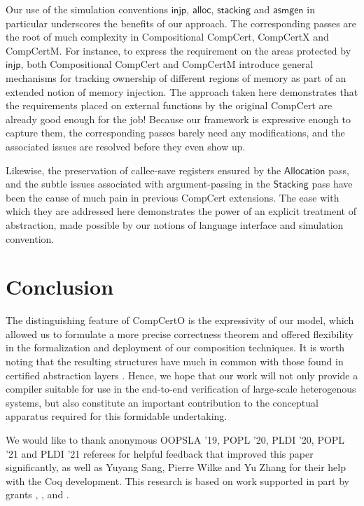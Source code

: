 \documentclass[sigplan,10pt,review]{acmart}
\newcommand{\kw}[1]{\ensuremath{ \mathsf{#1} }}
\begin{document}
Our use of the simulation conventions
\kw{injp}, \kw{alloc}, \kw{stacking} and \kw{asmgen}
in particular
underscores the benefits of our approach.
The corresponding passes are the root of
much complexity
in Compositional CompCert, CompCertX and CompCertM.
For instance,
to express the requirement on
the areas protected by \kw{injp},
both Compositional CompCert and CompCertM
introduce general mechanisms for tracking ownership of
different regions of memory
as part of an extended notion of memory injection.
The approach taken here demonstrates that
the requirements placed on external functions
by the original CompCert
are already good enough for the job!
Because our framework is expressive enough to capture them,
the corresponding passes barely need any modifications,
and the associated issues are resolved before they even show up.

Likewise, the preservation of callee-save registers
ensured by the \kw{Allocation} pass,
and the subtle issues associated with argument-passing
in the \kw{Stacking} pass
have been the cause of much pain
in previous CompCert extensions.
The ease with which they are addressed here
demonstrates the power of
an explicit treatment of abstraction,
made possible
by our notions of language interface and simulation convention.


\section{Conclusion} \label{sec:concl} %

The distinguishing feature of CompCertO
is the expressivity of our model,
which allowed us to formulate a more precise correctness theorem
and offered flexibility
in the formalization and deployment of
our composition techniques.
It is worth noting that
the resulting structures have much in common with
those found in
certified abstraction layers \cite{popl15,rbgs-cal}.
Hence,
we hope that our work will not only
provide a compiler
suitable for use in the end-to-end verification of
large-scale heterogenous systems,
but also constitute an important contribution
to the conceptual apparatus
required for this formidable undertaking.


\begin{acks}
We would like to thank anonymous
OOPSLA '19,
POPL '20,
PLDI '20,
POPL '21 and
PLDI '21
referees for helpful feedback that
improved this paper significantly,
as well as Yuyang Sang, Pierre Wilke and Yu Zhang
for their help with the Coq development.
This research is based on work supported in part by
 grants
,
, and
.
\end{acks}
\end{document}
